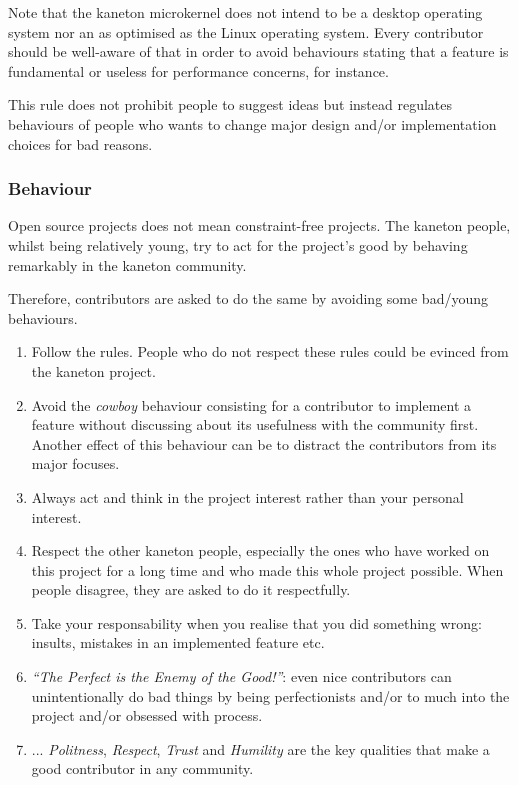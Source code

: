 Note that the kaneton microkernel does not intend to be a desktop operating
system nor an as optimised as the Linux operating system. Every contributor
should be well-aware of that in order to avoid behaviours stating that a
feature is fundamental or useless for performance concerns, for instance.

This rule does not prohibit people to suggest ideas but instead regulates
behaviours of people who wants to change major design and/or implementation
choices for bad reasons.


\subsubsection{Behaviour}

Open source projects does not mean constraint-free projects. The kaneton
people, whilst being relatively young, try to act for the project's good
by behaving remarkably in the kaneton community.

Therefore, contributors are asked to do the same by avoiding some bad/young
behaviours.

\begin{enumerate}
  \item
    Follow the rules. People who do not respect these rules could be evinced
    from the kaneton project.
  \item
    Avoid the \textit{cowboy} behaviour consisting for a contributor to
    implement a feature without discussing about its usefulness with the
    community first. Another effect of this behaviour can be to distract
    the contributors from its major focuses.
  \item
    Always act and think in the project interest rather than your personal
    interest.
  \item
    Respect the other kaneton people, especially the ones who have worked
    on this project for a long time and who made this whole project possible.
    When people disagree, they are asked to do it respectfully.
  \item
    Take your responsability when you realise that you did something wrong:
    insults, mistakes in an implemented feature etc.
  \item
    \textit{``The Perfect is the Enemy of the Good!''}: even nice
    contributors can unintentionally do bad things by being perfectionists
    and/or to much into the project and/or obsessed with process.
  \item
    ... \textit{Politness}, \textit{Respect}, \textit{Trust} and
    \textit{Humility} are the key qualities that make a good contributor in
    any community.
\end{enumerate}


